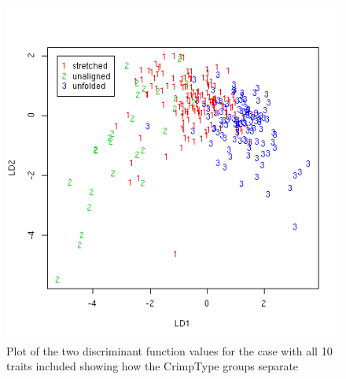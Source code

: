 %

\begin{figure}[!h]
  \centering
  \includegraphics[width=1.1\textwidth]{figlda1.png}
  \caption{Plot of the two discriminant function values for the case with all 10 traits included showing how the CrimpType groups separate}
  \label{fig:lda1}
\end{figure}

%

